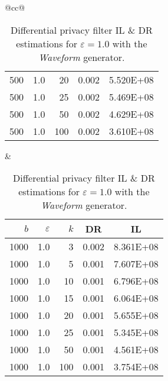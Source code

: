 \begin{table}[H]
\begin{tabular}{@{}cc@{}}
\begin{tabular}{@{}rrrrr@{}}
			500	&	1.0	&	20	&	0.002	&	5.520E+08 \\
			500	&	1.0	&	25	&	0.002	&	5.469E+08 \\
			500	&	1.0	&	50	&	0.002	&	4.629E+08 \\
			500	&	1.0	&	100	&	0.002	&	3.610E+08 \\
		\end{tabular}
		&
		\begin{tabular}{@{}rrrrr@{}}
			\toprule
			$b$ & $\varepsilon$ & $k$ & \multicolumn{1}{c}{DR} & \multicolumn{1}{c}{IL} \\ \midrule
			1000	&	1.0	&	3	&	0.002	&	8.361E+08 \\
			1000	&	1.0	&	5	&	0.001	&	7.607E+08 \\
			1000	&	1.0	&	10	&	0.001	&	6.796E+08 \\
			1000	&	1.0	&	15	&	0.001	&	6.064E+08 \\
			1000	&	1.0	&	20	&	0.001	&	5.655E+08 \\
			1000	&	1.0	&	25	&	0.001	&	5.345E+08 \\
			1000	&	1.0	&	50	&	0.001	&	4.561E+08 \\
			1000	&	1.0	&	100	&	0.001	&	3.754E+08 \\
		\end{tabular}
	\end{tabular}
	\caption[Differential privacy filter DR \& IL estimations (Waveform), $\varepsilon = 1.0$.]{Differential privacy filter IL \& DR estimations for $\varepsilon = 1.0$ with the \textit{Waveform} generator.}
\end{table}


